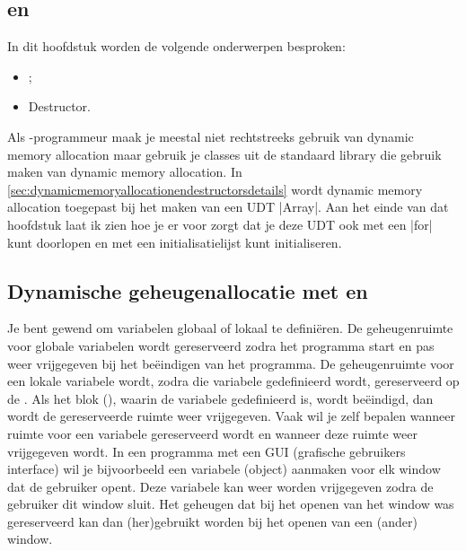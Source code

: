 \begin{cpplstShortInline}
\chapter{ en }
\label{sec:dynamicmemoryallocationendestructors}

In dit hoofdstuk worden de volgende onderwerpen besproken:
\begin{itemize}
    \item {};
    \item Destructor.
\end{itemize}

Als \Cpp{}-programmeur maak je meestal niet rechtstreeks gebruik van dynamic memory allocation maar gebruik je classes uit de standaard library die gebruik maken van dynamic memory allocation. 
In \cref{sec:dynamicmemoryallocationendestructorsdetails} wordt dynamic memory allocation toegepast bij het maken van een UDT |Array|. 
Aan het einde van dat hoofdstuk laat ik zien hoe je er voor zorgt dat je deze UDT ook met een  |for| kunt doorlopen en met een initialisatielijst kunt initialiseren.

\section[Dynamische geheugenallocatie met \texttt{new} en \texttt{delete}]{Dynamische geheugenallocatie met \texorpdfstring{}{new} en \texorpdfstring{}{delete}}
\label{sec:delete}\label{sec:new}
Je bent gewend om variabelen globaal of lokaal te definiëren.
De geheugenruimte voor globale variabelen wordt gereserveerd zodra het programma start en pas weer vrijgegeven bij het beëindigen van het programma.
De geheugenruimte voor een lokale variabele wordt, zodra die variabele gedefinieerd wordt, gereserveerd op de .
Als het blok (), waarin de variabele gedefinieerd is, wordt beëindigd, dan wordt de gereserveerde ruimte weer vrijgegeven.
Vaak wil je zelf bepalen wanneer ruimte voor een variabele gereserveerd wordt en wanneer deze ruimte weer vrijgegeven wordt.
In een programma met een GUI (grafische gebruikers interface) wil je bijvoorbeeld een variabele (object) aanmaken voor elk window dat de gebruiker opent.
Deze variabele kan weer worden vrijgegeven zodra de gebruiker dit window sluit.
Het geheugen dat bij het openen van het window was gereserveerd kan dan (her)gebruikt worden bij het openen van een (ander) window.


\end{cpplstShortInline}
